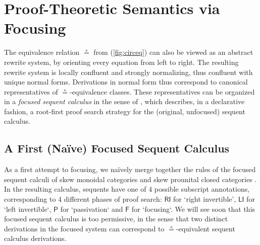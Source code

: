 \documentclass[copyright,creativecommons]{eptcs}
\theoremstyle{definition}
\newcommand{\RI}{\mathsf{RI}}
\newcommand{\LI}{\mathsf{LI}}
\newcommand{\Pass}{\mathsf{P}}
\newcommand{\F}{\mathsf{F}}
\begin{document}
\section{Proof-Theoretic Semantics via Focusing}
\label{sec:focus}

The equivalence relation $\circeq$ from (\ref{fig:circeq}) can also be viewed as an abstract rewrite system, by orienting every equation from left to right. The resulting rewrite system is locally confluent and strongly normalizing, thus confluent with unique normal forms. Derivations in normal form thus correspond to canonical representatives of $\circeq$-equivalence classes.
These representatives can be organized in a \emph{focused sequent calculus} in the sense of \cite{andreoli:logic:1992}, which describes, in a declarative fashion, a root-first proof search strategy for the (original, unfocused) sequent calculus.

\subsection{A First (Na{\"i}ve) Focused Sequent Calculus}
As a first attempt to focusing, we na{\"i}vely merge together the rules of the focused sequent calculi of skew monoidal categories \cite{uustalu:sequent:2021} and skew prounital closed categories \cite{uustalu:deductive:nodate}. In the resulting calculus, sequents have one of 4 possible subscript annotations, corresponding to 4 different phases of proof search: $\RI$ for `right invertible', $\LI$ for `left invertible`, $\Pass$ for `passivation` and $\F$ for `focusing`. We will see soon that this focused sequent calculus is too permissive, in the sense that two distinct derivations in the focused system can correspond to $\circeq$-equivalent sequent calculus derivations.
\end{document}
